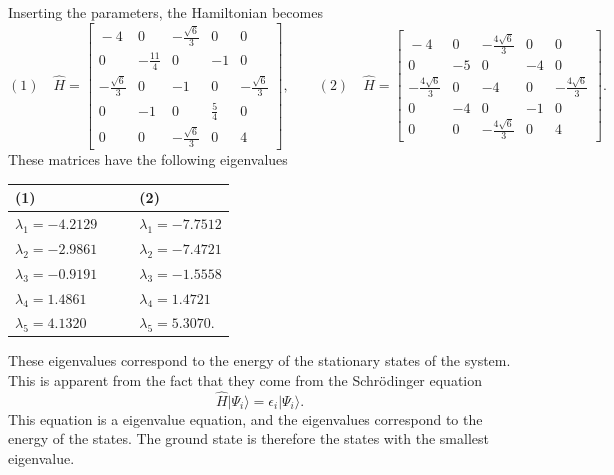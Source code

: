 \documentclass[a4paper, 11pt, notitlepage, english]{article}
\newcommand{\ket}[1]{|#1 \rangle}
\newcommand{\op}[1]{\hat{#1}}
\newcommand{\eps}{\epsilon}
\begin{document}
Inserting the parameters, the Hamiltonian becomes
$$ (1) \quad \op{H} = \left[\begin{smallmatrix}{}-4 & 0 & - \frac{\sqrt{6}}{3} & 0 & 0\\0 & - \frac{11}{4} & 0 & -1 & 0\\- \frac{\sqrt{6}}{3} & 0 & -1 & 0 & - \frac{\sqrt{6}}{3}\\0 & -1 & 0 & \frac{5}{4} & 0\\0 & 0 & - \frac{\sqrt{6}}{3} & 0 & 4\end{smallmatrix}\right], \qquad (2) \quad \op{H} = \left[\begin{smallmatrix}{}-4 & 0 & - \frac{4 \sqrt{6}}{3} & 0 & 0\\0 & -5 & 0 & -4 & 0\\- \frac{4 \sqrt{6}}{3} & 0 & -4 & 0 & - \frac{4 \sqrt{6}}{3}\\0 & -4 & 0 & -1 & 0\\0 & 0 & - \frac{4 \sqrt{6}}{3} & 0 & 4\end{smallmatrix}\right].
$$
These matrices have the following eigenvalues
\begin{center}
\begin{tabular}{l l|l l}
	\qquad (1) & \hspace{0.25cm} & \hspace{0.25cm} & \qquad (2) \\ \hline
$\lambda_1 = -4.2129$ & & & $ \lambda_1 = -7.7512 $\\
$\lambda_2 = -2.9861$ & & & $ \lambda_2 = -7.4721 $\\
$\lambda_3 = -0.9191$ & & & $ \lambda_3 = -1.5558 $\\
$\lambda_4 = 1.4861 $& & &  $\lambda_4 = 1.4721 $\\
$\lambda_5 = 4.1320 $& & &  $\lambda_5 = 5.3070 $.
\end{tabular}
\end{center}
These eigenvalues correspond to the energy of the stationary states of the system. This is apparent from the fact that they come from the Schrödinger equation
$$\op{H}\ket{\Psi_i} = \eps_i\ket{\Psi_i}.$$
This equation is a eigenvalue equation, and the eigenvalues correspond to the energy of the states. The ground state is therefore the states with the smallest eigenvalue.
\end{document}
